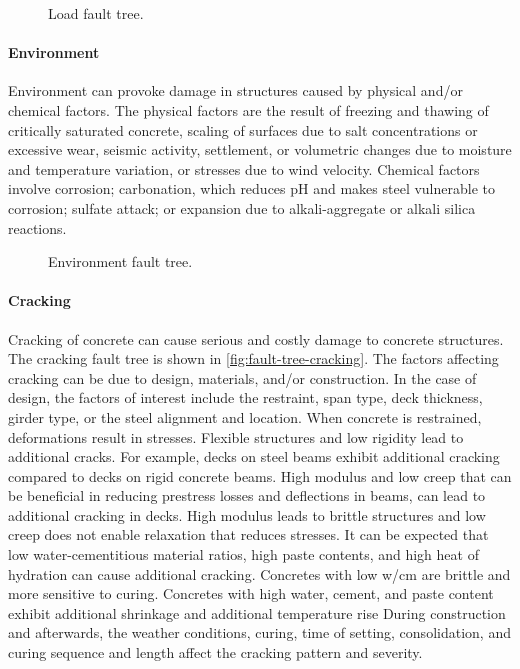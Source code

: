 \begin{figure}
  \caption{Load fault tree.}
  \label{fig:fault-tree-load} 
\end{figure}

\paragraph{Environment}
Environment can provoke damage in structures caused by physical and/or chemical factors. The physical factors are the result of freezing and thawing of critically saturated concrete, scaling of surfaces due to salt concentrations or excessive wear, seismic activity, settlement, or volumetric changes due to moisture and temperature variation, or stresses due to wind velocity. Chemical factors involve corrosion; carbonation, which reduces pH and makes steel vulnerable to corrosion; sulfate attack; or expansion due to alkali-aggregate or alkali silica reactions.

\begin{figure}
  \caption{Environment fault tree.}
  \label{fig:fault-tree-environment} 
\end{figure}

\paragraph{Cracking}
Cracking of concrete can cause serious and costly damage to concrete structures. The cracking fault tree is shown in \cref{fig:fault-tree-cracking}. The factors affecting cracking can be due to design, materials, and/or construction. In the case of design, the factors of interest include the restraint, span type, deck thickness, girder type, or the steel alignment and location. When concrete is restrained, deformations result in stresses. Flexible structures and low rigidity lead to additional cracks. For example, decks on steel beams exhibit additional cracking compared to decks on rigid concrete beams. High modulus and low creep that can be beneficial in reducing prestress losses and deflections in beams, can lead to additional cracking in decks. High modulus leads to brittle structures and low creep does not enable relaxation that reduces stresses. It can be expected that low water-cementitious material ratios, high paste contents, and high heat of hydration can cause additional cracking. Concretes with low w/cm are brittle and more sensitive to curing. Concretes with high water, cement, and paste content exhibit additional shrinkage and additional temperature rise During construction and afterwards, the weather conditions, curing, time of setting, consolidation, and curing sequence and length affect the cracking pattern and severity.


